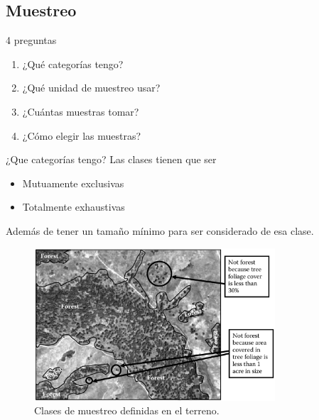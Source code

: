 \documentclass[]{beamer}
\begin{document}
\subsection{Muestreo}

\begin{frame}{\subsecname}
  \begin{block}{4 preguntas}
  \begin{enumerate}
    \item ¿Qué categorías tengo?
    \item ¿Qué unidad de muestreo usar?
    \item ¿Cuántas muestras tomar?
    \item ¿Cómo elegir las muestras?
  \end{enumerate}
  \end{block}
\end{frame}

\begin{frame}{\subsecname}
  \begin{block}{¿Que categorías tengo?}
    Las clases tienen que ser \pause
    \begin{itemize}[<+>]
      \item Mutuamente exclusivas
      \item Totalmente exhaustivas
    \end{itemize}
    Además de tener un tamaño mínimo para ser considerado de esa clase.
  \end{block}
\end{frame}

\begin{frame}{\subsecname}
  \begin{figure}
  \includegraphics[width=0.8\textwidth]{imagenes/unidad_mapa.png}
  \caption{Clases de muestreo definidas en el terreno.}
  \end{figure}
\end{frame}
\end{document}
